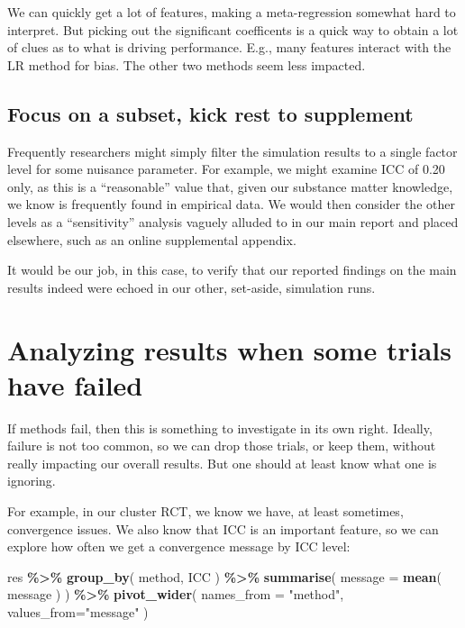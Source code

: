 \documentclass[
]{book}
\newenvironment{Shaded}{\begin{snugshade}}{\end{snugshade}}
\newcommand{\AttributeTok}[1]{\textcolor[rgb]{0.13,0.29,0.53}{#1}}
\newcommand{\FunctionTok}[1]{\textcolor[rgb]{0.13,0.29,0.53}{\textbf{#1}}}
\newcommand{\NormalTok}[1]{#1}
\newcommand{\SpecialCharTok}[1]{\textcolor[rgb]{0.81,0.36,0.00}{\textbf{#1}}}
\newcommand{\StringTok}[1]{\textcolor[rgb]{0.31,0.60,0.02}{#1}}
\begin{document}
We can quickly get a lot of features, making a meta-regression somewhat hard to interpret.
But picking out the significant coefficents is a quick way to obtain a lot of clues as to what is driving performance.
E.g., many features interact with the LR method for bias.
The other two methods seem less impacted.

\subsection{Focus on a subset, kick rest to supplement}\label{focus-on-a-subset-kick-rest-to-supplement}

Frequently researchers might simply filter the simulation results to a single factor level for some nuisance parameter.
For example, we might examine ICC of 0.20 only, as this is a ``reasonable'' value that, given our substance matter knowledge, we know is frequently found in empirical data.
We would then consider the other levels as a ``sensitivity'' analysis vaguely alluded to in our main report and placed elsewhere, such as an online supplemental appendix.

It would be our job, in this case, to verify that our reported findings on the main results indeed were echoed in our other, set-aside, simulation runs.

\section{Analyzing results when some trials have failed}\label{analyzing-results-when-some-trials-have-failed}

If methods fail, then this is something to investigate in its own right.
Ideally, failure is not too common, so we can drop those trials, or keep them, without really impacting our overall results.
But one should at least know what one is ignoring.

For example, in our cluster RCT, we know we have, at least sometimes, convergence issues.
We also know that ICC is an important feature, so we can explore how often we get a convergence message by ICC level:

\begin{Shaded}
\begin{Highlighting}[]
\NormalTok{res }\SpecialCharTok{\%\textgreater{}\%} 
  \FunctionTok{group\_by}\NormalTok{( method, ICC ) }\SpecialCharTok{\%\textgreater{}\%}
  \FunctionTok{summarise}\NormalTok{( }\AttributeTok{message =} \FunctionTok{mean}\NormalTok{( message ) ) }\SpecialCharTok{\%\textgreater{}\%}
  \FunctionTok{pivot\_wider}\NormalTok{( }\AttributeTok{names\_from =} \StringTok{"method"}\NormalTok{, }\AttributeTok{values\_from=}\StringTok{"message"}\NormalTok{ )}
\end{Highlighting}
\end{Shaded}
\end{document}
